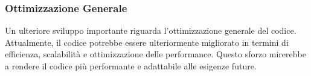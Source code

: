 \subsubsection{Ottimizzazione Generale}

Un ulteriore sviluppo importante riguarda l'ottimizzazione 
generale del codice. Attualmente, il codice potrebbe essere 
ulteriormente migliorato in termini di efficienza, scalabilità e 
ottimizzazione delle performance. Questo sforzo mirerebbe a rendere 
il codice più performante e adattabile alle esigenze future.